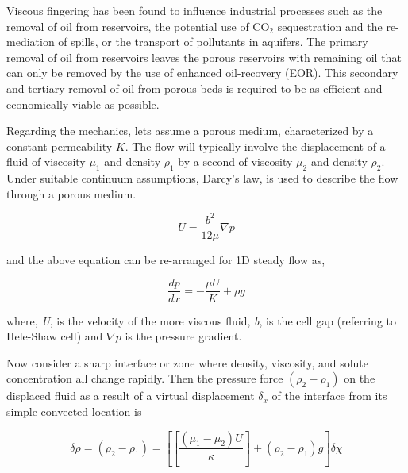 \documentclass[preprint,authoryear,12pt]{elsarticle}
\begin{document}
Viscous fingering has been found to influence industrial processes such as the removal of oil from reservoirs, the potential use of CO$_2$ sequestration and the re-mediation of spills, or the transport of pollutants in aquifers. The primary removal of oil from reservoirs leaves the porous reservoirs with remaining oil that can only be removed by the use of enhanced oil-recovery (EOR). This secondary and tertiary removal of oil from porous beds is required to be as efficient and economically viable as possible.


Regarding the mechanics, lets assume a porous medium, characterized by a constant permeability $K$. The flow will typically involve the displacement of a fluid of viscosity $\mu_1$  and density $\rho_1$ by a second of viscosity $\mu_2$ and density $\rho_2$. Under suitable continuum assumptions, Darcy's law, is used to describe the flow through a porous medium.

\begin{equation}
 U = \frac{b^2}{12 \mu} \nabla p
\end{equation}

and the above equation can be re-arranged for 1D steady flow as,

\begin{equation}
 \frac{dp}{dx}= - \frac{\mu U}{K} + \rho g 
\end{equation}


where, \textit{U}, is the velocity of the more viscous fluid, \textit{b}, is the cell gap (referring to Hele-Shaw cell) and \textit{$\nabla p$} is the pressure gradient.



Now consider a sharp interface or zone where density, viscosity, and solute concentration all change rapidly. Then the pressure force $(\rho_2-\rho_1)$ on the displaced fluid as a result of a virtual displacement $\delta_x$ of the interface from its simple convected location is 

\begin{equation}
\delta\rho=(\rho_2-\rho_1)=[[\frac{(\mu_1-\mu_2)U}{\kappa}]+(\rho_2-\rho_1)g] \delta\chi
\end{equation}
\end{document}
